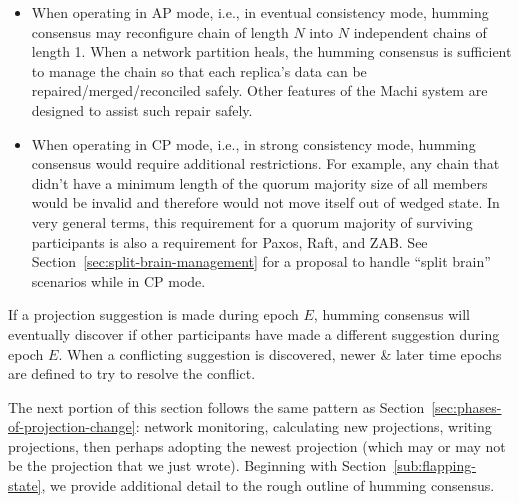 \documentclass[preprint,10pt]{sigplanconf}
\begin{document}
\begin{itemize}

\item When operating in AP mode, i.e., in eventual consistency mode, humming
consensus may reconfigure chain of length $N$ into $N$
independent chains of length 1.  When a network partition heals, the
humming consensus is sufficient to manage the chain so that each
replica's data can be repaired/merged/reconciled safely.
Other features of the Machi system are designed to assist such
repair safely.

\item When operating in CP mode, i.e., in strong consistency mode, humming
consensus would require additional restrictions.  For example, any
chain that didn't have a minimum length of the quorum majority size of
all members would be invalid and therefore would not move itself out
of wedged state.  In very general terms, this requirement for a quorum
majority of surviving participants is also a requirement for Paxos,
Raft, and ZAB. See Section~\ref{sec:split-brain-management} for a
proposal to handle ``split brain'' scenarios while in CP mode.

\end{itemize}

If a projection suggestion is made during epoch $E$, humming consensus
will eventually discover if other participants have made a different
suggestion during epoch $E$.  When a conflicting suggestion is
discovered, newer \& later time epochs are defined to try to resolve
the conflict.

The next portion of this section follows the same pattern as
Section~\ref{sec:phases-of-projection-change}: network monitoring,
calculating new projections, writing projections, then perhaps
adopting the newest projection (which may or may not be the projection
that we just wrote).
Beginning with Section~\ref{sub:flapping-state}, we provide
additional detail to the rough outline of humming consensus.
\end{document}
